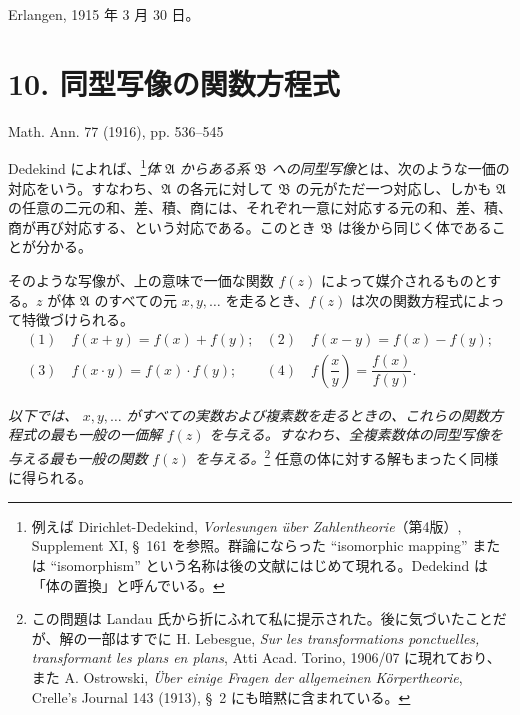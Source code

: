 \documentclass[11pt]{article}
\begin{document}
\medskip
\noindent Erlangen, 1915 年 3 月 30 日。

\clearpage
\section*{10. 同型写像の関数方程式}
\begin{center}
Math. Ann. 77 (1916), pp. 536--545
\end{center}

Dedekind によれば、\footnote{例えば Dirichlet-Dedekind, \emph{Vorlesungen über Zahlentheorie}（第4版）, Supplement XI, \S\ 161 を参照。群論にならった ``isomorphic mapping'' または ``isomorphism'' という名称は後の文献にはじめて現れる。Dedekind は「体の置換」と呼んでいる。}\emph{体} $\mathfrak A$ \emph{からある系} $\mathfrak B$ \emph{への同型写像}とは、次のような一価の対応をいう。すなわち、$\mathfrak A$ の各元に対して $\mathfrak B$ の元がただ一つ対応し、しかも $\mathfrak A$ の任意の二元の和、差、積、商には、それぞれ一意に対応する元の和、差、積、商が再び対応する、という対応である。このとき $\mathfrak B$ は後から同じく体であることが分かる。

そのような写像が、上の意味で一価な関数 $f(z)$ によって媒介されるものとする。$z$ が体 $\mathfrak A$ のすべての元 $x,y,\ldots$ を走るとき、$f(z)$ は次の関数方程式によって特徴づけられる。
\[
\begin{array}{ll}
(1)\quad f(x+y)=f(x)+f(y); & (2)\quad f(x-y)=f(x)-f(y);\\[0.45em]
(3)\quad f(x\cdot y)=f(x)\cdot f(y); & (4)\quad f\!\left(\dfrac{x}{y}\right)=\dfrac{f(x)}{f(y)}.
\end{array}
\]

\emph{以下では、} $x,y,\ldots$ \emph{がすべての実数および複素数を走るときの、これらの関数方程式の最も一般の一価解} $f(z)$ \emph{を与える。すなわち、全複素数体の同型写像を与える最も一般の関数} $f(z)$ \emph{を与える。}\footnote{この問題は Landau 氏から折にふれて私に提示された。後に気づいたことだが、解の一部はすでに H. Lebesgue, \emph{Sur les transformations ponctuelles, transformant les plans en plans}, Atti Acad. Torino, 1906/07 に現れており、また A. Ostrowski, \emph{Über einige Fragen der allgemeinen Körpertheorie}, Crelle's Journal 143 (1913), \S\ 2 にも暗黙に含まれている。} 任意の体に対する解もまったく同様に得られる。
\end{document}
